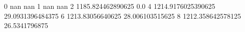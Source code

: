 0 nan nan
1 nan nan
2 1185.824462890625 0.0
4 1214.9176025390625 29.0931396484375
6 1213.83056640625 28.006103515625
8 1212.358642578125 26.5341796875
